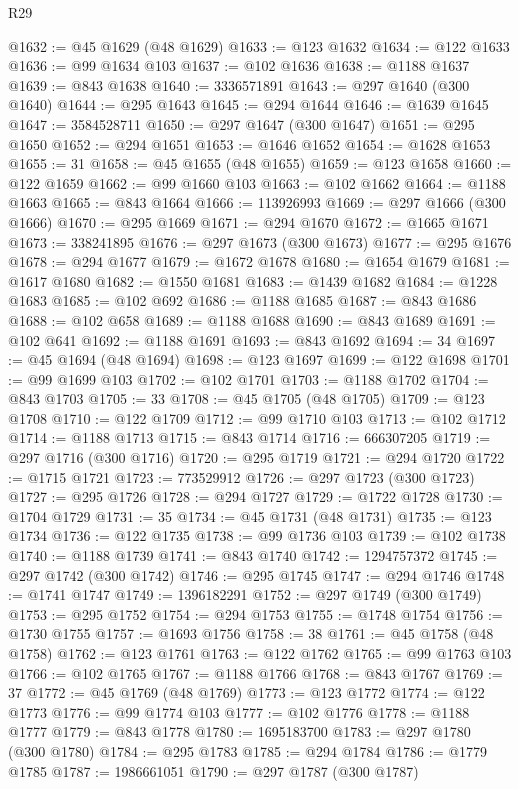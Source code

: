 \begin{lexlean}{R29}
\begin{coremodule}
@1632 := @45 @1629 (@48 @1629)
@1633 := @123 @1632
@1634 := @122 @1633
@1636 := @99 @1634 @103
@1637 := @102 @1636
@1638 := @1188 @1637
@1639 := @843 @1638
@1640 := 3336571891
@1643 := @297 @1640 (@300 @1640)
@1644 := @295 @1643
@1645 := @294 @1644
@1646 := @1639 @1645
@1647 := 3584528711
@1650 := @297 @1647 (@300 @1647)
@1651 := @295 @1650
@1652 := @294 @1651
@1653 := @1646 @1652
@1654 := @1628 @1653
@1655 := 31
@1658 := @45 @1655 (@48 @1655)
@1659 := @123 @1658
@1660 := @122 @1659
@1662 := @99 @1660 @103
@1663 := @102 @1662
@1664 := @1188 @1663
@1665 := @843 @1664
@1666 := 113926993
@1669 := @297 @1666 (@300 @1666)
@1670 := @295 @1669
@1671 := @294 @1670
@1672 := @1665 @1671
@1673 := 338241895
@1676 := @297 @1673 (@300 @1673)
@1677 := @295 @1676
@1678 := @294 @1677
@1679 := @1672 @1678
@1680 := @1654 @1679
@1681 := @1617 @1680
@1682 := @1550 @1681
@1683 := @1439 @1682
@1684 := @1228 @1683
@1685 := @102 @692
@1686 := @1188 @1685
@1687 := @843 @1686
@1688 := @102 @658
@1689 := @1188 @1688
@1690 := @843 @1689
@1691 := @102 @641
@1692 := @1188 @1691
@1693 := @843 @1692
@1694 := 34
@1697 := @45 @1694 (@48 @1694)
@1698 := @123 @1697
@1699 := @122 @1698
@1701 := @99 @1699 @103
@1702 := @102 @1701
@1703 := @1188 @1702
@1704 := @843 @1703
@1705 := 33
@1708 := @45 @1705 (@48 @1705)
@1709 := @123 @1708
@1710 := @122 @1709
@1712 := @99 @1710 @103
@1713 := @102 @1712
@1714 := @1188 @1713
@1715 := @843 @1714
@1716 := 666307205
@1719 := @297 @1716 (@300 @1716)
@1720 := @295 @1719
@1721 := @294 @1720
@1722 := @1715 @1721
@1723 := 773529912
@1726 := @297 @1723 (@300 @1723)
@1727 := @295 @1726
@1728 := @294 @1727
@1729 := @1722 @1728
@1730 := @1704 @1729
@1731 := 35
@1734 := @45 @1731 (@48 @1731)
@1735 := @123 @1734
@1736 := @122 @1735
@1738 := @99 @1736 @103
@1739 := @102 @1738
@1740 := @1188 @1739
@1741 := @843 @1740
@1742 := 1294757372
@1745 := @297 @1742 (@300 @1742)
@1746 := @295 @1745
@1747 := @294 @1746
@1748 := @1741 @1747
@1749 := 1396182291
@1752 := @297 @1749 (@300 @1749)
@1753 := @295 @1752
@1754 := @294 @1753
@1755 := @1748 @1754
@1756 := @1730 @1755
@1757 := @1693 @1756
@1758 := 38
@1761 := @45 @1758 (@48 @1758)
@1762 := @123 @1761
@1763 := @122 @1762
@1765 := @99 @1763 @103
@1766 := @102 @1765
@1767 := @1188 @1766
@1768 := @843 @1767
@1769 := 37
@1772 := @45 @1769 (@48 @1769)
@1773 := @123 @1772
@1774 := @122 @1773
@1776 := @99 @1774 @103
@1777 := @102 @1776
@1778 := @1188 @1777
@1779 := @843 @1778
@1780 := 1695183700
@1783 := @297 @1780 (@300 @1780)
@1784 := @295 @1783
@1785 := @294 @1784
@1786 := @1779 @1785
@1787 := 1986661051
@1790 := @297 @1787 (@300 @1787)

\end{coremodule}
\end{lexlean}
